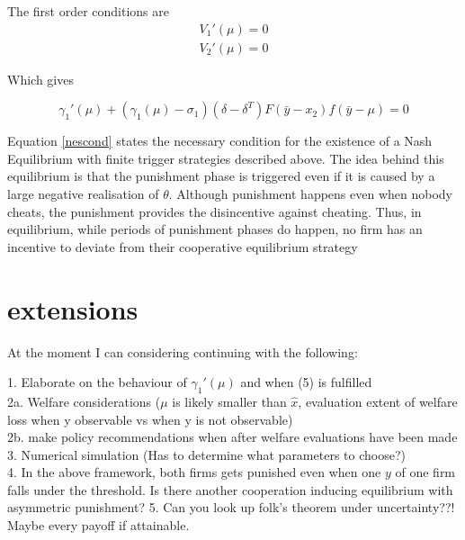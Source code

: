 \documentclass{article}
\begin{document}
The first order conditions are 
\begin{align*}
V_1'(\mu) = 0\\
V_2'(\mu) = 0
\end{align*}

Which gives

\begin{equation}
[1-\delta + s_1s_2(\delta-\delta^T)]\gamma_1'(\mu) + (\gamma_1(\mu)-\sigma_1)(\delta-\delta^T)F(\bar{y} - x_2)f(\bar{y}-\mu) = 0
\label{nescond}
\end{equation}

Equation \ref{nescond} states the necessary condition for the existence of a Nash Equilibrium with finite trigger strategies described above. The idea behind this equilibrium is that the punishment phase is triggered even if it is caused by a large negative realisation of $\theta$. Although punishment happens even when nobody cheats, the punishment provides the disincentive against cheating. Thus, in equilibrium, while periods of punishment phases do happen, no firm has an incentive to deviate from their cooperative equilibrium strategy

\section{extensions}

At the moment I can considering continuing with the following:

1. Elaborate on the behaviour of $\gamma_1'(\mu)$ and when (5) is fulfilled\\
2a. Welfare considerations ($\mu$ is likely smaller than $\hat{x}$, evaluation extent of welfare loss when y observable vs when y is not observable)\\
2b. make policy recommendations when after welfare evaluations have been made
3. Numerical simulation (Has to determine what parameters to choose?)\\
4. In the above framework, both firms gets punished even when one $y$ of one firm falls under the threshold. Is there another cooperation inducing equilibrium with asymmetric punishment?
5. Can you look up folk's theorem under uncertainty??! Maybe every payoff if attainable.
\end{document}

